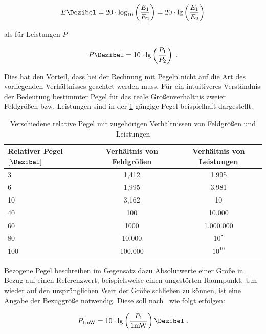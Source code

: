 \begin{equation}
    E \si{\Dezibel} = 20 \cdot \log_{10} \left( \frac{E_1}{E_2} \right) = 20 \cdot \lg \left( \frac{E_1}{E_2} \right)
\end{equation}

als für Leistungen $P$

\begin{equation}
    P \si{\Dezibel} = 10 \cdot \lg \left( \frac{P_1}{P_2} \right) \; .
\end{equation}

Dies hat den Vorteil, dass bei der Rechnung mit Pegeln nicht auf die Art des vorliegenden Verhältnisses geachtet werden muss. Für ein intuitiveres Verständnis der Bedeutung bestimmter Pegel für das reale Großenverhältnis zweier Feldgrößen bzw. Leistungen sind in der \Tabelle\ref{tab:2_Relative_Pegel} gängige Pegel beispielhaft dargestellt.

\begin{table}
\renewcommand{\arraystretch}{\tablestretch}
\centering
\caption{Verschiedene relative Pegel mit zugehörigen Verhältnissen von Feldgrößen und Leistungen}
\vspace{\tablespace}
\begin{tabular}{l c c}
    \toprule
    Relativer Pegel $\left[\si{\Dezibel}\right]$ & Verhältnis von Feldgrößen & Verhältnis von Leistungen \\
    \midrule
    3   &   1,412   &   1,995   \\
    6   &   1,995   &   3,981   \\
    10  &   3,162   &   10      \\
    40  &   100     &   10.000  \\
    60  &   1000    &   1.000.000 \\
    80  &   10.000  &   $10^8$  \\
    100 &   100.000  &   $10^{10}$ \\
    \bottomrule
\end{tabular}
\label{tab:2_Relative_Pegel}
\end{table}

Bezogene Pegel beschreiben im Gegensatz dazu Absolutwerte einer Größe in Bezug auf einen Referenzwert, beispielsweise einen ungestörten Raumpunkt. Um wieder auf den ursprünglichen Wert der Größe schließen zu können, ist eine Angabe der Bezuggröße notwendig. Diese soll nach~\cite{IEC60027-3} wie folgt erfolgen: 

\begin{equation}
    P_{1 \si{\milli\watt}} = 10 \cdot \lg \left( \frac{P_1}{1 \si{\milli\watt}}\right) \si{\Dezibel} \; .
\end{equation}

